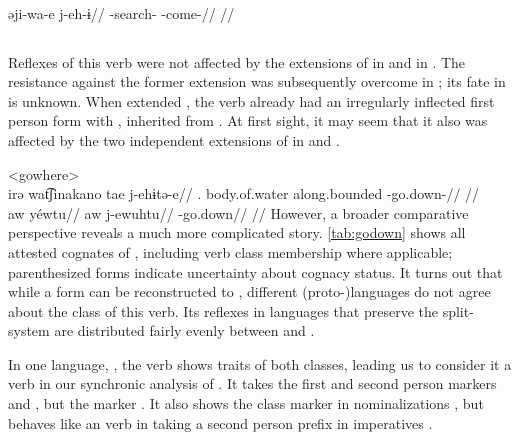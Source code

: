 \carijo \parencite[][102]{guerrero2019carijo}\\
\begingl
\gla əji-wa-e j-eh-ɨ//
\glb {}-search- -come-//
\glft {}//
\endgl
\xe

\subsection{ }
\label{sec:godown}
Reflexes of this verb were not affected by the extensions of  in \PPek {} and  in \akuriyo {}.
The resistance against the former extension was subsequently overcome in \bakairi; its fate in \ikpeng is unknown.
When \akuriyo extended , the verb already had an irregularly inflected first person form with , inherited from \PTir.
At first sight, it may seem that it also was affected by the two independent extensions of  in \carijo {} and \yukpa {}.

\pex<gowhere>
 \carijo {}\\
\begingl
\gla irə wat͡ʃinakano tae j-ehɨtə-e//
\glb {}. body.of.water along.bounded -go.down-//
\glft {}//
\endgl
{} \yukpa \parencite[][]{meira2003primeras}\\
\begingl
\glpreamble aw yéwtu//
\gla aw j-ewuhtu//
\glb {} -go.down//
\glft {}//
\endgl
\xe
%
However, a broader comparative perspective reveals a much more complicated story.
\cref{tab:godown} shows all attested cognates of , including verb class membership where applicable; parenthesized forms indicate uncertainty about cognacy status.
It turns out that while a form  can be reconstructed to \PC, different (proto-)languages do not agree about the class of this verb.
Its reflexes in languages that preserve the split- system are distributed fairly evenly between  and .



In one language, \wayana, the verb shows traits of both classes, leading us to consider it a  verb in our synchronic analysis of \wayana.
It takes the first and second person  markers  and  \parencite[200]{wayanatavares2005}, but the  marker  \parencite[206]{wayanatavares2005}.
It also shows the  class marker  in nominalizations , but behaves like an  verb in taking a second person prefix in imperatives .

